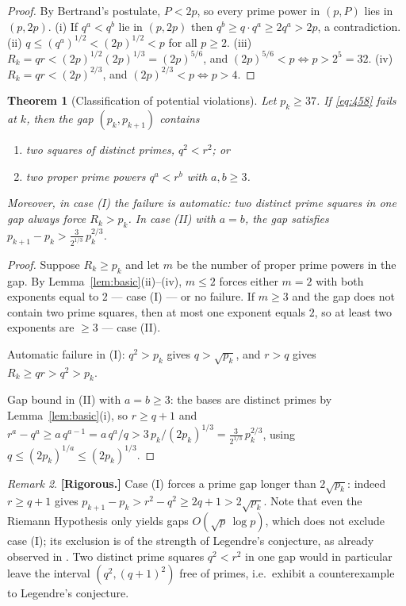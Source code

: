 \documentclass[11pt]{amsart}
\newtheorem{theorem}{Theorem}[section]
\theoremstyle{definition}
\theoremstyle{remark}
\newtheorem{remark}[theorem]{Remark}
\begin{document}
\begin{proof}
By Bertrand's postulate, $P<2p$, so every prime power in $(p,P)$ lies in $(p,2p)$.
(i) If $q^a<q^b$ lie in $(p,2p)$ then $q^b\ge q\cdot q^a\ge 2q^a>2p$, a contradiction.
(ii) $q\le (q^a)^{1/2}<(2p)^{1/2}<p$ for all $p\ge2$.
(iii) $R_k=qr<(2p)^{1/2}(2p)^{1/3}=(2p)^{5/6}$, and $(2p)^{5/6}<p \iff p>2^5=32$.
(iv) $R_k=qr<(2p)^{2/3}$, and $(2p)^{2/3}<p\iff p>4$.
\end{proof}

\begin{theorem}[Classification of potential violations]\label{thm:class}
Let $p_k\ge 37$. If \eqref{eq:458} fails at $k$, then the gap $(p_k,p_{k+1})$ contains
\begin{enumerate}
\item[\textup{(I)}] two squares of distinct primes, $q^2<r^2$; or
\item[\textup{(II)}] two proper prime powers $q^a<r^b$ with $a,b\ge 3$.
\end{enumerate}
Moreover, in case \textup{(I)} the failure is automatic: two distinct prime squares in one gap always force $R_k>p_k$. In case \textup{(II)} with $a=b$, the gap satisfies $p_{k+1}-p_k>\tfrac{3}{2^{1/3}}\,p_k^{2/3}$.
\end{theorem}

\begin{proof}
Suppose $R_k\ge p_k$ and let $m$ be the number of proper prime powers in the gap. By Lemma~\ref{lem:basic}(ii)--(iv), $m\le2$ forces either $m=2$ with both exponents equal to $2$ --- case (I) --- or no failure. If $m\ge3$ and the gap does not contain two prime squares, then at most one exponent equals $2$, so at least two exponents are $\ge3$ --- case (II).

Automatic failure in (I): $q^2>p_k$ gives $q>\sqrt{p_k}$, and $r>q$ gives $R_k\ge qr>q^2>p_k$.

Gap bound in (II) with $a=b\ge3$: the bases are distinct primes by Lemma~\ref{lem:basic}(i), so $r\ge q+1$ and
$r^a-q^a\ge a\,q^{a-1} = a\,q^a/q > 3\,p_k/(2p_k)^{1/3} = \tfrac{3}{2^{1/3}}\,p_k^{2/3}$,
using $q\le(2p_k)^{1/a}\le(2p_k)^{1/3}$.
\end{proof}

\begin{remark}\label{rem:I}
\textbf{[Rigorous.]} Case (I) forces a prime gap longer than $2\sqrt{p_k}$: indeed $r\ge q+1$ gives $p_{k+1}-p_k > r^2-q^2 \ge 2q+1 > 2\sqrt{p_k}$. Note that even the Riemann Hypothesis only yields gaps $O(\sqrt{p}\,\log p)$, which does not exclude case (I); its exclusion is of the strength of Legendre's conjecture, as already observed in \cite{Bl458}. Two distinct prime squares $q^2<r^2$ in one gap would in particular leave the interval $(q^2,(q+1)^2)$ free of primes, i.e.\ exhibit a counterexample to Legendre's conjecture.
\end{remark}
\end{document}

